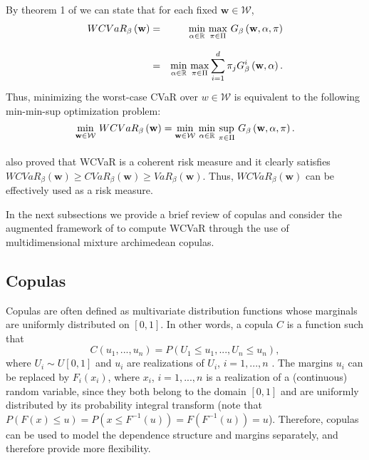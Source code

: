 \documentclass[a4paper,12pt]{report}
\begin{document}
\vspace{0.3cm}
By theorem 1 of \citet*{zhu2009worst} we can state that for each fixed $%
\mathbf{w}\in \mathcal{W}$,
\begin{eqnarray}
WCVaR_{\beta }\left( \mathbf{w}\right) &=&\underset{}{\underset{\alpha \in
		\mathbb{R}
	}{\min }~\underset{\pi \in \Pi }{\max }}~G_{\beta }\left( \mathbf{w},\alpha
,\pi \right)  \notag \\
&=&\underset{}{\underset{\alpha \in
		\mathbb{R}
	}{\min }~\underset{\pi \in \Pi }{\max }}\sum_{i=1}^{d}\pi _{j}G_{\beta
}^{i}\left( \mathbf{w},\alpha \right) .  \label{18}
\end{eqnarray}%
Thus, minimizing the worst-case CVaR over $w\in \mathcal{W}$ is equivalent
to the following min-min-sup optimization problem:
\begin{equation}
\underset{}{\underset{\mathbf{w}\in \mathcal{W}}{\min }}~WCVaR_{\beta
}\left( \mathbf{w}\right) =\underset{}{\underset{\mathbf{w}\in \mathcal{W}}{%
		\min }~\underset{\alpha \in
		\mathbb{R}
	}{\min }~\underset{\pi \in \Pi }{\sup }}~G_{\beta }\left( \mathbf{w},\alpha
,\pi \right) .  \label{19}
\end{equation}%
\citet*{zhu2009worst} also proved that WCVaR is a coherent risk measure and
it clearly satisfies $WCVaR_{\beta }\left( \mathbf{w}\right) \geq
CVaR_{\beta }\left( \mathbf{w}\right) \geq VaR_{\beta }\left( \mathbf{w}%
\right) $. Thus, $WCVaR_{\beta }\left( \mathbf{w}\right) $ can be
effectively used as a risk measure.

\bigskip

In the next subsections we provide a brief review of copulas and consider
the augmented framework of \citet*{kakouris14} to compute WCVaR through the
use of multidimensional mixture archimedean copulas.

\vspace{0.6cm}

\subsection{Copulas}

Copulas are often defined as multivariate distribution functions whose
marginals are uniformly distributed on $[0,1]$. In other words, a copula $C$
is a function such that
\begin{equation}
C\left( u_{1},...,u_{n}\right) =P\left( U_{1}\leq u_{1},...,U_{n}\leq
u_{n}\right) ,  \label{20}
\end{equation}%
where $U_{i}\sim U[0,1]$ and $u_{i}$ are realizations of $U_{i}$, $i=1,...,n$%
. The margins $u_{i}$ can be replaced by $F_{i}\left( x_{i}\right) $, where $%
x_{i}$, $i=1,...,n$ is a realization of a (continuous) random variable,
since they both belong to the domain $[0,1]$ and are uniformly distributed
by its probability integral transform (note that $P\left( F\left( x\right)
\leq u\right) =P\left( x\leq F^{-1}\left( u\right) \right) =F\left(
F^{-1}\left( u\right) \right) =u$). Therefore, copulas can be used to model
the dependence structure and margins separately, and therefore provide more
flexibility.
\end{document}
